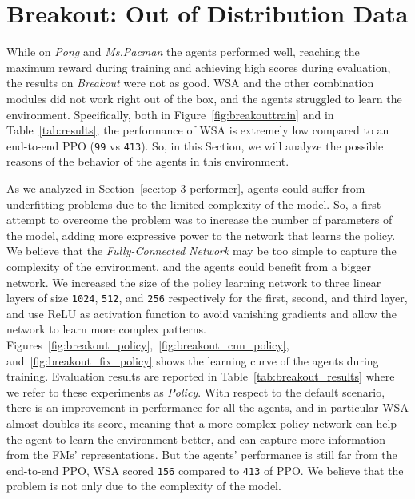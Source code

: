 \section{Breakout: Out of Distribution Data}\label{sec:breakout_study}
While on \textit{Pong} and \textit{Ms.Pacman} the agents performed well, reaching the maximum reward during training and achieving high scores during evaluation, the results on \textit{Breakout} were not as good.
WSA and the other combination modules did not work right out of the box, and the agents struggled to learn the environment.
Specifically, both in Figure~\ref{fig:breakouttrain} and in Table~\ref{tab:results}, the performance of WSA is extremely low compared to an end-to-end PPO (\texttt{99} vs \texttt{413}).
So, in this Section, we will analyze the possible reasons of the behavior of the agents in this environment.

As we analyzed in Section~\ref{sec:top-3-performer}, agents could suffer from underfitting problems due to the limited complexity of the model.
So, a first attempt to overcome the problem was to increase the number of parameters of the model, adding more expressive power to the network that learns the policy.
We believe that the \textit{Fully-Connected Network} may be too simple to capture the complexity of the environment, and the agents could benefit from a bigger network.
We increased the size of the policy learning network to three linear layers of size \texttt{1024}, \texttt{512}, and \texttt{256} respectively for the first, second, and third layer, and use ReLU as activation function to avoid vanishing gradients and allow the network to learn more complex patterns.
Figures~\ref{fig:breakout_policy},~\ref{fig:breakout_cnn_policy}, and~\ref{fig:breakout_fix_policy}
shows the learning curve of the agents during training.
Evaluation results are reported in Table~\ref{tab:breakout_results} where we refer to these experiments as \textit{Policy}.
With respect to the default scenario, there is an improvement in performance for all the agents, and in particular WSA almost doubles its score, meaning that a more complex policy network can help the agent to learn the environment better, and can capture more information from the FMs' representations.
But the agents' performance is still far from the end-to-end PPO, WSA scored \texttt{156} compared to \texttt{413} of PPO\@.
We believe that the problem is not only due to the complexity of the model.



